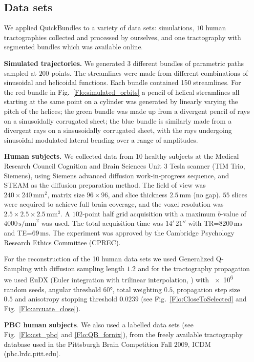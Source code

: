 \documentclass{bioinfo}
\begin{document}
\begin{methods}
\subsection{\label{sub:QB-Data-sets}Data sets}

We applied QuickBundles to a variety of data sets: simulations, $10$
human tractographies collected and processed by ourselves, and one
tractography with segmented bundles which was available online.

\textbf{Simulated trajectories.} We generated $3$ different bundles of
parametric paths sampled at $200$ points. The streamlines were made from
different combinations of sinusoidal and helicoidal functions.  Each
bundle contained 150 streamlines.  For the red bundle in
Fig.~\ref{Flo:simulated_orbits} a pencil of helical streamlines all
starting at the same point on a cylinder was generated by linearly
varying the pitch of the helices; the green bundle was made up from a
divergent pencil of rays on a sinusoidally corrugated sheet; the blue
bundle is similarly made from a divergent rays on a sinsusoidally
corrugated sheet, with the rays undergoing sinusoidal modulated lateral
bending over a range of amplitudes.

\textbf{Human subjects.} We collected data from $10$ healthy subjects at
the Medical Research Council Cognition and Brain Sciences Unit 3 Tesla
scanner (TIM Trio, Siemens), using Siemens advanced diffusion
work-in-progress sequence, and STEAM \citep{merboldt1992diffusion,MAB04}
as the diffusion preparation method. The field of view was
$240\times240\,\textrm{mm}^{2}$, matrix size $96\times96$, and slice
thickness $2.5\,\textrm{mm}$ (no gap).  $55$ slices were acquired to
achieve full brain coverage, and the voxel resolution was
$2.5\times2.5\times2.5\,\textrm{mm}^{3}$. A $102$-point half grid
acquisition \citep{Yeh2010} with a maximum $b$-value of $4000\,
\textrm{s/mm}^{2}$ was used.  The total acquisition time was $14'\,21''$
with TR=$8200\,\textrm{ms}$ and TE=$69\,\textrm{ms}$. The experiment was
approved by the Cambridge Psychology Research Ethics Committee (CPREC).

For the reconstruction of the 10 human data sets we used Generalized
Q-Sampling \citep{Yeh2010} with diffusion sampling length $1.2$ and for
the tractography propagation we used EuDX (Euler integration with
trilinear interpolation, \citep{Garyfallidis_thesis}) with \num{e6}
random seeds, angular threshold \ang{60}, total weighting $0.5$,
propagation step size $0.5$ and anisotropy stopping threshold $0.0239$
(see Fig.~\ref{Flo:CloseToSelected} and Fig.~\ref{Flo:arcuate_close}).

\textbf{PBC human subjects}. We also used a labelled data sets (see
Fig.~\ref{Flo:cst_pbc} and \ref{Flo:QB_fornix}), from the freely
available tractography database used in the Pittsburgh Brain Competition
Fall $2009$, ICDM (pbc.lrdc.pitt.edu).

\end{methods}
\end{document}
